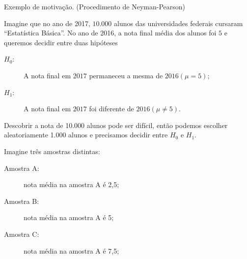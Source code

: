 \documentclass[8pt]{beamer}
\begin{document}
\begin{frame}{Exemplo de motivação. (Procedimento de Neyman-Pearson)}

\large

Imagine que no ano de 2017, $10.000$ alunos das universidades federais cursaram ``Estatística Básica''. No ano de 2016, a nota final média dos alunos foi $5$ e queremos decidir entre duas hipóteses 
\begin{description}
  \item[$H_0$:]  A nota final em $2017$ permaneceu a mesma de $2016(\mu=5)$;
  \item[$H_1$:]  A nota final em $2017$ foi diferente de $2016(\mu\neq 5)$.
\end{description}
\vfill

Descobrir a nota de 10.000 alunos pode ser difícil, então podemos escolher aleatoriamente 1.000 alunos e precisamos decidir entre $H_0$ e $H_1$.
\vfill
  
Imagine três amostras distintas:
\begin{description}
\item[Amostra A:] nota média na amostra A é 2,5;  
\item[Amostra B:] nota média na amostra A é 5; 
\item[Amostra C:] nota média na amostra A é 7,5;
\end{description}

\normalsize

\end{frame}
\end{document}
